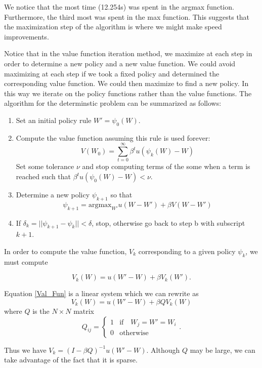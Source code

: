 We notice that the most time (12.254s) was spent in the argmax function.  Furthermore, the third most was spent in the max function.  This suggests that the maximization step of the algorithm is where we might make speed improvements.

Notice that in the value function iteration method, we maximize at each step in order to determine a new policy and a new value function.  We could avoid maximizing at each step if we took a fixed policy and determined the corresponding value function.  We could then maximize to find a new policy.  In this way we iterate on the policy functions rather than the value functions.  The algorithm for the determinstic problem can be summarized as follows:

\begin{enumerate}
	\item Set an initial policy rule $W' = \psi_0(W)$.
	
	\item Compute the value function assuming this rule is used forever:
\begin{equation}
V(W_0) = \sum_{t=0}^\infty \beta^t u(\psi_k(W)-W)
\end{equation}
Set some tolerance $\nu$ and stop computing terms of the some when a term is reached such that $\beta^t u(\psi_0(W) - W) < \nu$.

	\item Determine a new policy $\psi_{k+1}$ so that
	\begin{equation}
		\psi_{k+1} = \text{argmax}_{W'} u(W-W') + \beta V(W-W')
	\end{equation}
	
	\item If $\delta_k = ||\psi_{k+1} - \psi_k|| < \delta$, stop, otherwise go back to step b with subscript $k+1$.
\end{enumerate}

In order to compute the value function, $V_k$ corresponding to a given policy $\psi_k$, we must compute

\begin{equation}\label{Val_Fun}
V_k(W) = u(W'-W) + \beta V_k(W').
\end{equation}

Equation \eqref{Val_Fun} is a linear system which we can rewrite as
\begin{equation}\label{linear}
V_k(W) = u(W'-W) + \beta QV_k(W)
\end{equation}
where $Q$ is the $N\times N$ matrix
\begin{equation}
Q_{ij} = \left\{
     \begin{array}{lr}
       1 & \text{if} \quad  W_j = W' = W_i\\
       0 & \text{otherwise}
     \end{array}
   \right. .
\end{equation}

Thus we have $V_k = (I-\beta Q)^{-1}u(W'-W)$.  Although $Q$ may be large, we can take advantage of the fact that it is sparse.